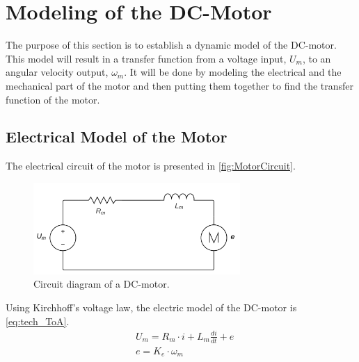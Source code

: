 \section{Modeling of the DC-Motor}
The purpose of this section is to establish a dynamic model of the DC-motor. This model will result in a transfer function from a voltage input, $U_m$, to an angular velocity output, $\omega_m$. It will be done by modeling the electrical and the mechanical part of the motor and then putting them together to find the transfer function of the motor.

\subsection*{Electrical Model of the Motor}
The electrical circuit of the motor is presented in \autoref{fig:MotorCircuit}.

\begin{figure}[htbp]
	\centering
 	\includegraphics[width=0.7\textwidth]{figures/modeling/Motor/MotorElectricCircuit.pdf} 
 	\caption{Circuit diagram of a DC-motor.}
 	\label{fig:MotorCircuit}
\end{figure}

Using Kirchhoff's voltage law, the electric model of the DC-motor is \autoref{eq:tech_ToA}.
\begin{subequations} \label{eq:tech_ToA}
	\begin{flalign}
		&U_m = R_m \cdot i + L_m \frac{di}{dt} + e \\
		&e = K_e \cdot \omega_m 
	\end{flalign}
\end{subequations}

\startexplain
\stopexplain


